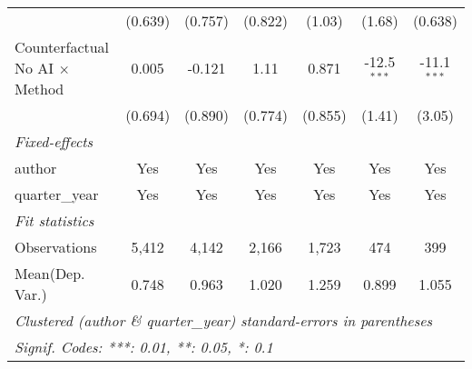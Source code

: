 \begin{tabular}{lcccccc}
                                         & (0.639)       & (0.757)       & (0.822)       & (1.03)        & (1.68)        & (0.638)\\   
   Counterfactual No AI $\times$ Method  & 0.005         & -0.121        & 1.11          & 0.871         & -12.5$^{***}$ & -11.1$^{***}$\\   
                                         & (0.694)       & (0.890)       & (0.774)       & (0.855)       & (1.41)        & (3.05)\\   
   \midrule
   \emph{Fixed-effects}\\
   author                                & Yes           & Yes           & Yes           & Yes           & Yes           & Yes\\  
   quarter\_year                         & Yes           & Yes           & Yes           & Yes           & Yes           & Yes\\  
   \midrule
   \emph{Fit statistics}\\
   Observations                          & 5,412         & 4,142         & 2,166         & 1,723         & 474           & 399\\  
Mean(Dep. Var.) & 0.748 & 0.963 & 1.020 & 1.259 & 0.899 & 1.055 \\
   \midrule \midrule
   \multicolumn{7}{l}{\emph{Clustered (author \& quarter\_year) standard-errors in parentheses}}\\
   \multicolumn{7}{l}{\emph{Signif. Codes: ***: 0.01, **: 0.05, *: 0.1}}\\
\end{tabular}
\par\endgroup
